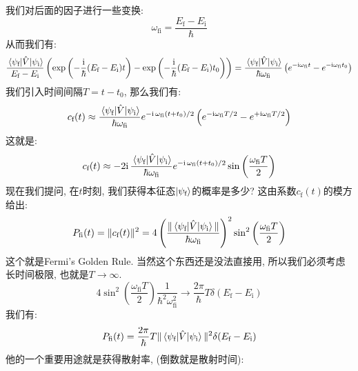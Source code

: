 我们对后面的因子进行一些变换:
\begin{equation}
  \omega_{\text{fi}} = \frac{E_{\text{f}} - E_{\text{i}}}{\hbar}
\end{equation}
从而我们有:
\begin{equation}
  \frac{\mel{\psi_{\text{f}}}{\hat{V}}{\psi_{\text{i}}}}{E_{\text{f}} - E_{\text{i}}} \left( \exp\left( -\frac{\mathrm{i}}{\hbar} (E_{\text{f}} - E_{\text{i}}) t \right) - \exp\left( -\frac{\mathrm{i}}{\hbar} (E_{\text{f}} - E_{\text{i}}) t_0 \right) \right) = \frac{\mel{\psi_{\text{f}}}{\hat{V}}{\psi_{\text{i}}}}{\hbar \omega_{\text{fi}}} \left( e^{-\mathrm{i} \omega_{\text{fi}} t} - e^{-\mathrm{i} \omega_{\text{fi}} t_0} \right)
\end{equation}
我们引入时间间隔$T=t - t_0$, 那么我们有:
\begin{equation}
  c_{\text{f}}(t) \approx \frac{\mel{\psi_{\text{f}}}{\hat{V}}{\psi_{\text{i}}}}{\hbar \omega_{\text{fi}}} e^{-\mathrm{i}\,\omega_{\text{fi}} (t+t_0)/2} \left( e^{-\mathrm{i} \omega_{\text{fi}} T/2} - e^{+\mathrm{i} \omega_{\text{fi}} T/2} \right)
\end{equation}
这就是:
\begin{equation}
  c_{\text{f}}(t) \approx -2 \mathrm{i}\, \frac{\mel{\psi_{\text{f}}}{\hat{V}}{\psi_{\text{i}}}}{\hbar \omega_{\text{fi}}} e^{-\mathrm{i}\,\omega_{\text{fi}} (t+t_0)/2} \sin\left( \frac{\omega_{\text{fi}} T}{2} \right)
\end{equation}
现在我们提问, 在$t$时刻, 我们获得本征态$\ket{\psi_{\text{f}}}$的概率是多少?
这由系数$c_{\text{f}}(t)$的模方给出:
\begin{equation}
  P_{\text{fi}}(t) = \|c_{\text{f}}(t)\|^2 = 4 \left( \frac{\|\mel{\psi_{\text{f}}}{\hat{V}}{\psi_{\text{i}}}\|}{\hbar \omega_{\text{fi}}} \right)^2 \sin^2\left( \frac{\omega_{\text{fi}} T}{2} \right)
\end{equation}
这个就是Fermi's Golden Rule.
当然这个东西还是没法直接用, 所以我们必须考虑长时间极限, 也就是$T \to \infty$.
\begin{equation}
  4 \sin^2\left( \frac{\omega_{\text{fi}} T}{2} \right)\frac{1}{\hbar^2 \omega^2_{\text{fi}}} \to  \frac{2\pi}{\hbar} T \delta(E_{\text{f}} - E_{\text{i}})
\end{equation}
我们有:
\begin{equation}
  P_{\text{fi}}(t) = \frac{2\pi}{\hbar} T \|\mel{\psi_{\text{f}}}{\hat{V}}{\psi_{\text{i}}}\|^2 \delta(E_{\text{f}} - E_{\text{i}})
\end{equation}
他的一个重要用途就是获得散射率, (倒数就是散射时间):
